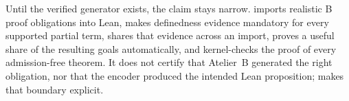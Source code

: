 Until the verified generator exists, the claim stays narrow.
\barrel{} imports realistic B proof obligations into Lean, makes definedness evidence
mandatory for every supported partial term, shares that evidence across an import, proves a
useful share of the resulting goals automatically, and kernel-checks the proof of every
admission-free theorem.
It does not certify that Atelier~B generated the right obligation, nor that the encoder
produced the intended Lean proposition;  makes that
boundary explicit.
